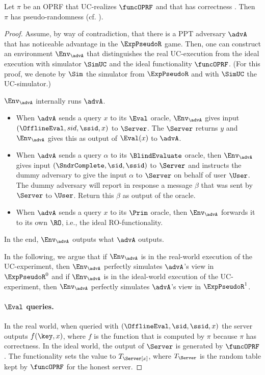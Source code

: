 \begin{lemma}
    \label{lem:UCpseudorand}
    Let $\pi$ be an OPRF that UC-realizes $\funcOPRF$ and that has correctness . Then $\pi$ has pseudo-randomness (cf. ).
\end{lemma}
\begin{proof}
    Assume, by way of contradiction, that there is a PPT adversary $\advA$ that has noticeable advantage in the $\ExpPseudoR$ game. Then, one can construct an environment $\Env_\advA$ that distinguishes the real UC-execution from the ideal execution with simulator $\SimUC$ and the ideal functionality
    $\funcOPRF$. (For this proof, we denote by $\Sim$ the simulator from $\ExpPseudoR$ and with $\SimUC$ the UC-simulator.)


    $\Env_\advA$ internally runs $\advA$.
    \begin{itemize}
        \item When $\advA$ sends a query $x$ to its $\Eval$ oracle, $\Env_\advA$ gives input $(\OfflineEval,sid,\ssid,x)$ to $\Server$. The $\Server$ returns $y$ and $\Env_\advA$ gives this as output of $\Eval(x)$ to $\advA$.
        \item When $\advA$ sends a query $\alpha$ to its $\BlindEvaluate$ oracle, then $\Env_\advA$ gives input $(\SndrComplete,\sid,\ssid)$ to $\Server$ and instructs the dummy adversary to give the input $\alpha$ to $\Server$ on behalf of user $\User$. The dummy adversary will report in response a message $\beta$ that was sent by $\Server$ to $\User$. Return this $\beta$ as output of the oracle.
        \item When $\advA$ sends a query $x$ to its $\Prim$ oracle, then $\Env_\advA$ forwards it to its own $\RO$, i.e., the ideal RO-functionality.
    \end{itemize}
    In the end, $\Env_\advA$ outputs what $\advA$ outputs.

    In the following, we argue that if $\Env_\advA$ is in the real-world execution of the UC-experiment, then $\Env_\advA$ perfectly simulates $\advA$'s view in $\ExpPseudoR^0$ and if $\Env_\advA$ is in the ideal-world execution of the UC-experiment, then $\Env_\advA$ perfectly simulates $\advA$'s view in $\ExpPseudoR^1$.

    \paragraph{$\Eval$ queries.} In the real world, when queried with $(\OfflineEval,\sid,\ssid,x)$ the server outputs $f(\key,x)$, where $f$ is the function that is computed by $\pi$ because $\pi$ has correctness. 
    In the ideal world, the output of $\Server$ is generated by $\funcOPRF$. The functionality sets the value to $T_\Server[x]$, where $T_\Server$ is the random table kept by $\funcOPRF$ for the honest server.
\end{proof}

